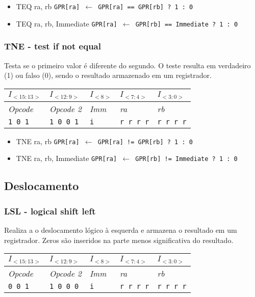 \documentclass[11pt,a4paper]{report}
\begin{document}
\begin{itemize}
\item TEQ ra, rb
\subitem \texttt{GPR[ra] $\leftarrow$ GPR[ra] == GPR[rb] ? 1 : 0}
\item TEQ ra, rb, Immediate
\subitem \texttt{GPR[ra] $\leftarrow$ GPR[rb] == Immediate ? 1 : 0}
\end{itemize}

\subsubsection{TNE - test if not equal}
Testa se o primeiro valor é diferente do segundo. O teste resulta em
verdadeiro (1) ou falso (0), sendo o resultado armazenado em um
registrador.

\begin{table}[htb!]
\centering
\begin{tabular}{|p{2cm}|p{2cm}|p{2cm}|p{2cm}|p{2cm}|}
\hline
$I_{<15:13>}$ & $I_{<12:9>}$ & $I_{<8>}$ & $I_{<7:4>}$ & $I_{<3:0>}$  \\ \hline
\textit{Opcode} & \textit{Opcode 2} & \textit{Imm} & \textit{ra} & \textit{rb} \\ \hline
\texttt{1 0 1} & \texttt{1 0 0 1} & \texttt{i} & \texttt{r r r r} & \texttt{r r r r} \\ \hline
\end{tabular}
\end{table}

\begin{itemize}
\item TNE ra, rb
\subitem \texttt{GPR[ra] $\leftarrow$ GPR[ra] != GPR[rb] ? 1 : 0}
\item TNE ra, rb, Immediate
\subitem \texttt{GPR[ra] $\leftarrow$ GPR[rb] != Immediate ? 1 : 0}
\end{itemize}


\subsection{Deslocamento}

\subsubsection{LSL - logical shift left}
Realiza a o deslocamento lógico à esquerda e armazena o resultado em um
registrador. Zeros são inseridos na parte menos significativa do
resultado.

\begin{table}[htb!]
\centering
\begin{tabular}{|p{2cm}|p{2cm}|p{2cm}|p{2cm}|p{2cm}|}
\hline
$I_{<15:13>}$ & $I_{<12:9>}$ & $I_{<8>}$ & $I_{<7:4>}$ & $I_{<3:0>}$  \\ \hline
\textit{Opcode} & \textit{Opcode 2} & \textit{Imm} & \textit{ra} & \textit{rb} \\ \hline
\texttt{0 0 1} & \texttt{1 0 0 0} & \texttt{i} & \texttt{r r r r} & \texttt{r r r r} \\ \hline
\end{tabular}
\end{table}
\end{document}
